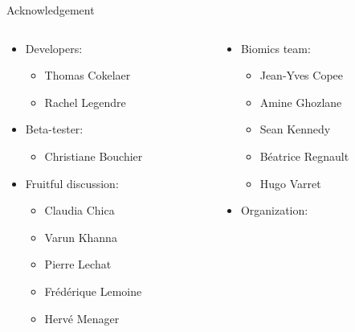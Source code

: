 \documentclass{beamer}
\begin{document}
\begin{frame}{Acknowledgement}
    \begin{columns}[t]
        \begin{column}{0.5\textwidth}
            \begin{itemize}
                \item Developers:
                \begin{itemize}
                    \item Thomas Cokelaer
                    \item Rachel Legendre
                \end{itemize}
                \item Beta-tester:
                    \begin{itemize}
                        \item Christiane Bouchier
                    \end{itemize}
                \item Fruitful discussion:
                    \begin{itemize}
                        \item Claudia Chica
                        \item Varun Khanna
                        \item Pierre Lechat
                        \item Frédérique Lemoine
                        \item Hervé Menager
                    \end{itemize}
            \end{itemize}
        \end{column}
        \begin{column}{0.5\textwidth}
            \begin{itemize}
                \item Biomics team:
                \begin{itemize}
                    \item Jean-Yves Copee
                    \item Amine Ghozlane
                    \item Sean Kennedy
                    \item Béatrice Regnault
                    \item Hugo Varret
                \end{itemize}
                \item Organization:


\end{itemize}
\end{column}
\end{columns}
\end{frame}
\end{document}
